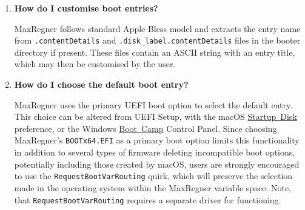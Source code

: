 \documentclass[]{article}
\providecommand{\tightlist}{%
  \setlength{\itemsep}{0pt}\setlength{\parskip}{0pt}}
\begin{document}
\begin{enumerate}
  \begin{itemize}
  \tightlist
  \item Refer to \texttt{boot-args} values such as \texttt{debug=0x100}, \texttt{keepsyms=1},
    \texttt{-v}, and similar.
  \item Do not forget about \texttt{AppleDebug} and \texttt{ApplePanic} properties.
  \item For macOS to correctly recognise and set up serial ports, the \texttt{CustomPciSerialDevice} quirk
    may be enabled when a PCI serial port card is installed.
  \item Take care of \texttt{Booter}, \texttt{Kernel}, and \texttt{UEFI} quirks.
  \item Consider using serial port to inspect early kernel boot failures. For this
    \texttt{debug=0x108}, \texttt{serial=5}, and \texttt{msgbuf=1048576} boot arguments are needed.
    Refer to the patches in Sample.plist when dying before serial init.
  \item Always read the logs carefully.
  \end{itemize}

\item
  \textbf{How do I customise boot entries?}

  MaxRegner follows standard Apple Bless model and extracts the entry name
  from \texttt{.contentDetails} and \texttt{.disk\_label.contentDetails} files in the
  booter directory if present. These files contain an ASCII string with an entry title,
  which may then be customised by the user.

\item
  \textbf{How do I choose the default boot entry?}

  MaxRegner uses the primary UEFI boot option to select the default entry. This choice
  can be altered from UEFI Setup, with the macOS
  \href{https://support.apple.com/HT202796}{Startup Disk} preference, or the Windows
  \href{https://support.apple.com/guide/bootcamp-control-panel/start-up-your-mac-in-windows-or-macos-bcmp29b8ac66/mac}{Boot Camp} Control Panel.
  Since choosing MaxRegner's \texttt{BOOTx64.EFI} as a primary boot option limits this
  functionality in addition to several types of firmware deleting incompatible boot options,
  potentially including those created by macOS, users are strongly encouraged to use the
  \texttt{RequestBootVarRouting} quirk, which will preserve the selection made in
  the operating system within the MaxRegner variable space. Note, that \texttt{RequestBootVarRouting}
  requires a separate driver for functioning.


\end{enumerate}
\end{document}
